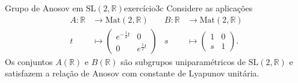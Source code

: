 \begin{example}{Grupo de Anosov em \(\mathrm{SL}(2, \mathbb{R})\)}{exercício3c}
    Considere as aplicações
    \begin{align*}
        A : \mathbb{R} & \to \mathrm{Mat}(2, \mathbb{R}) &
        B : \mathbb{R} & \to \mathrm{Mat}(2, \mathbb{R})\\
                     t &\mapsto \begin{pmatrix}
                           e^{-\frac12t} & 0\\
                           0 & e^{\frac12 t}
                       \end{pmatrix}&
                     s &\mapsto \begin{pmatrix}
                           1 & 0\\
                           s & 1
                       \end{pmatrix}.
    \end{align*}
    Os conjuntos \(A(\mathbb{R})\) e \(B(\mathbb{R})\) são subgrupos uniparamétricos de \(\mathrm{SL}(2, \mathbb{R})\) e satisfazem a relação de Anosov com constante de Lyapunov unitária.
\end{example}
